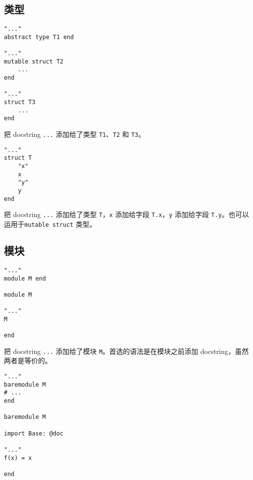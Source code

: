 \subsection{类型}




\begin{lstlisting}
"..."
abstract type T1 end

"..."
mutable struct T2
    ...
end

"..."
struct T3
    ...
end
\end{lstlisting}



把 docstring \texttt{{\textquotedbl}...{\textquotedbl}} 添加给了类型 \texttt{T1}、\texttt{T2} 和 \texttt{T3}。




\begin{verbatim}
"..."
struct T
    "x"
    x
    "y"
    y
end
\end{verbatim}



把 docstring \texttt{{\textquotedbl}...{\textquotedbl}} 添加给了类型 \texttt{T}，\texttt{{\textquotedbl}x{\textquotedbl}} 添加给字段 \texttt{T.x}，\texttt{{\textquotedbl}y{\textquotedbl}} 添加给字段 \texttt{T.y}。也可以运用于\texttt{mutable struct} 类型。



\hypertarget{18307601734386005108}{}


\subsection{模块}




\begin{verbatim}
"..."
module M end

module M

"..."
M

end
\end{verbatim}



把 docstring \texttt{{\textquotedbl}...{\textquotedbl}} 添加给了模块 \texttt{M}。首选的语法是在模块之前添加 docstring，虽然两者是等价的。




\begin{verbatim}
"..."
baremodule M
# ...
end

baremodule M

import Base: @doc

"..."
f(x) = x

end
\end{verbatim}



